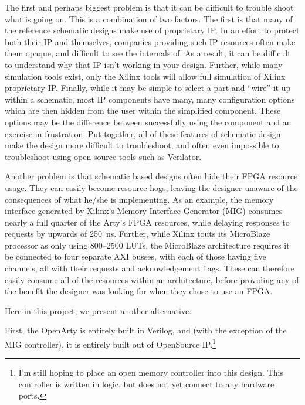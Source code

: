 \documentclass{gqtekspec}
\begin{document}
The first and perhaps biggest problem is that it can be difficult to trouble
shoot what is going on.  This is a combination of two factors.  The first is
that many of the reference schematic designs make use of proprietary IP.  In
an effort to protect both their IP and themselves, companies providing such
IP resources often make them opaque, and difficult to see the internals of.
As a result, it can be difficult to understand why that IP isn't working in
your design.  Further, while many simulation tools exist, only the Xilinx tools
will allow full simulation of Xilinx proprietary IP.  Finally, while it may be
simple to select a part and ``wire'' it up within a schematic, most IP
components have many, many configuration options which are then hidden from the
user within the simplified component.  These options may be the difference
between successfully using the component and an exercise in frustration.  
Put together, all of these features of schematic design make the design more
difficult to troubleshoot, and often even impossible to troubleshoot using
open source tools such as Verilator.

Another problem is that schematic based designs often hide their FPGA resource
usage.  They can easily become resource hogs, leaving the designer unaware
of the consequences of what he/she is implementing.  As an example, the memory
interface generated by Xilinx's Memory Interface Generator (MIG) consumes
nearly a full quarter of the Arty's FPGA resources, while delaying responses
to requests by upwards of 250~ns.  Further, while Xilinx touts its MicroBlaze
processor as only using 800--2500 LUTs, the MicroBlaze architecture requires
it be connected to four separate AXI busses, with each of those having
five channels, all with their requests and acknowledgement flags.  These
can therefore easily consume all of the resources within an architecture, before
providing any of the benefit the designer was looking for when they chose to
use an FPGA.


%
%

Here in this project, we present another alternative.

First, the OpenArty is entirely built in Verilog, and (with the exception of
the MIG controller), it is entirely built out of OpenSource IP.\footnote{I'm
still hoping to place an open memory controller into this design.  This
controller is written in logic, but does not yet connect to any hardware ports.}
\end{document}
